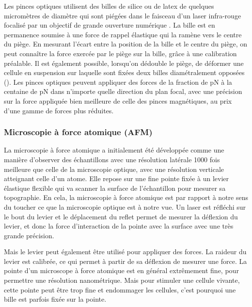 Les pinces optiques utilisent des billes de silice ou de latex de quelques micromètres de diamètre qui sont piégées dans le faisceau d’un laser infra-rouge focalisé par un objectif de grande ouverture numérique \parencite{neuman_optical_2004}.
La bille est en permanence soumise à une force de rappel élastique qui la ramène vers le centre du piège. 
En mesurant l'écart entre la position de la bille et le centre du piège, on peut connaître la force exercée par le piège sur la bille, grâce à une calibration préalable. 
Il est également possible, lorsqu'on dédouble le piège, de déformer une cellule en suspension sur laquelle sont fixées deux billes diamétralement opposées (\cite{henon_new_1999}). 
Les pinces optiques peuvent appliquer des forces de la fraction de pN à la centaine de pN dans n'importe quelle direction du plan focal, avec une précision sur la force appliquée bien meilleure de celle des pinces magnétiques, au prix d'une gamme de forces plus réduites. 

\subsubsection{Microscopie à force atomique (AFM)}

La microscopie à force atomique a initialement été développée comme une manière d'observer des échantillons avec une résolution latérale 1000 fois meilleure que celle de la microscopie optique, avec une résolution verticale atteignant celle d'un atome. 
Elle repose sur une fine pointe fixée à un levier élastique flexible qui va scanner la surface de l'échantillon pour mesurer sa topographie. En cela, la microscopie à force atomique est par rapport à notre sens du toucher ce que la microscopie optique est à notre vue. Un laser est réfléchi sur le bout du levier et le déplacement du reflet permet de mesurer la déflexion du levier, et donc la force d'interaction de la pointe avec la surface avec une très grande précision. 

Mais le levier peut également être utilisé pour appliquer des forces. La raideur du levier est calibrée, ce qui permet à partir de sa déflexion de mesurer une force. 
La pointe d'un microscope à force atomique est en général extrêmement fine, pour permettre une résolution nanométrique. Mais pour stimuler une cellule vivante, cette pointe peut être trop fine et endommager les cellules, c'est pourquoi une bille est parfois fixée sur la pointe.

